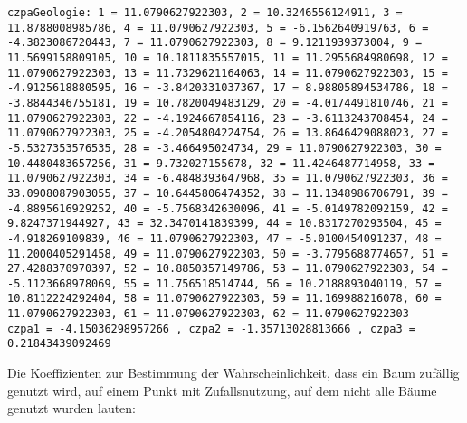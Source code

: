 \documentclass[twocolumn]{scrartcl}
\begin{document}
\texttt{czpaGeologie: 1 = 11.0790627922303, 2 = 10.3246556124911, 3 = 11.8788008985786, 4 = 11.0790627922303, 5 = -6.1562640919763, 6 = -4.3823086720443, 7 = 11.0790627922303, 8 = 9.1211939373004, 9 = 11.5699158809105, 10 = 10.1811835557015, 11 = 11.2955684980698, 12 = 11.0790627922303, 13 = 11.7329621164063, 14 = 11.0790627922303, 15 = -4.9125618880595, 16 = -3.8420331037367, 17 = 8.98805894534786, 18 = -3.8844346755181, 19 = 10.7820049483129, 20 = -4.0174491810746, 21 = 11.0790627922303, 22 = -4.1924667854116, 23 = -3.6113243708454, 24 = 11.0790627922303, 25 = -4.2054804224754, 26 = 13.8646429088023, 27 = -5.5327353576535, 28 = -3.466495024734, 29 = 11.0790627922303, 30 = 10.4480483657256, 31 = 9.732027155678, 32 = 11.4246487714958, 33 = 11.0790627922303, 34 = -6.4848393647968, 35 = 11.0790627922303, 36 = 33.0908087903055, 37 = 10.6445806474352, 38 = 11.1348986706791, 39 = -4.8895616929252, 40 = -5.7568342630096, 41 = -5.0149782092159, 42 = 9.8247371944927, 43 = 32.3470141839399, 44 = 10.8317270293504, 45 = -4.918269109839, 46 = 11.0790627922303, 47 = -5.0100454091237, 48 = 11.2000405291458, 49 = 11.0790627922303, 50 = -3.7795688774657, 51 = 27.4288370970397, 52 = 10.8850357149786, 53 = 11.0790627922303, 54 = -5.1123668978069, 55 = 11.756518514744, 56 = 10.2188893040119, 57 = 10.8112224292404, 58 = 11.0790627922303, 59 = 11.169988216078, 60 = 11.0790627922303, 61 = 11.0790627922303, 62 = 11.0790627922303\\
  czpa1 = -4.15036298957266
  , czpa2 = -1.35713028813666
  , czpa3 = 0.21843439092469
}

Die Koeffizienten zur Bestimmung der Wahrscheinlichkeit, dass ein Baum zufällig genutzt wird, auf einem Punkt mit Zufallsnutzung, auf dem nicht alle Bäume genutzt wurden lauten:
\end{document}
